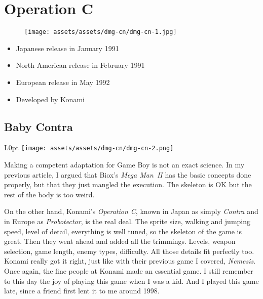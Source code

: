 \documentclass{book}
\begin{document}
\begingroup \chapter*{Operation C} \endgroup
\begin{figure}[H]
\vskip 4pt
\centering
\texttt{[image: assets/assets/dmg-cn/dmg-cn-1.jpg]}\end{figure}
\begin{itemize} [nosep]




\item Japanese release in January 1991







\item North American release in February 1991







\item European release in May 1992












\item Developed by Konami

\end{itemize}\noindent

\newpage\FloatBarrier\needspace{10mm}\section*{Baby Contra}\nopagebreak[4]
\begin{wrapfigure}{L}{0pt} \texttt{[image: assets/assets/dmg-cn/dmg-cn-2.png]}\end{wrapfigure}
Making a competent adaptation for Game Boy is not an exact science. In my previous article, I argued that Biox’s \emph{Mega Man II} has the basic concepts done properly, but that they just mangled the execution. The skeleton is OK but the rest of the body is too weird.

On the other hand, Konami’s \emph{Operation C}, known in Japan as simply \emph{Contra} and in Europe as \emph{Probotector}, is the real deal. The sprite size, walking and jumping speed, level of detail, everything is well tuned, so the skeleton of the game is great. Then they went ahead and added all the trimmings. Levels, weapon selection, game length, enemy types, difficulty. All those details fit perfectly too. Konami really got it right, just like with their previous game I covered, \emph{Nemesis}. Once again, the fine people at Konami made an essential game. I still remember to this day the joy of playing this game when I was a kid. And I played this game late, since a friend first lent it to me around 1998.
\end{document}
